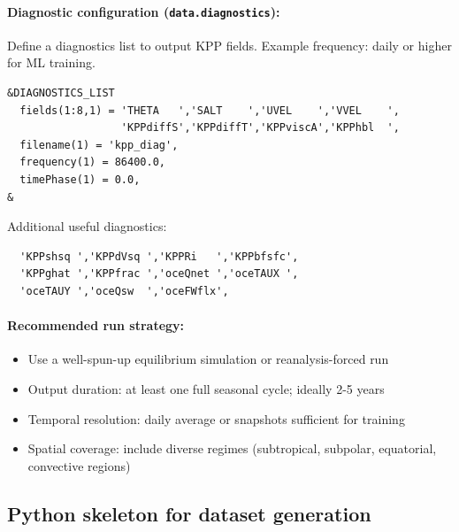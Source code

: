 \documentclass[11pt, a4paper]{article}
\begin{document}
\paragraph{Diagnostic configuration (\texttt{data.diagnostics}):}

Define a diagnostics list to output KPP fields. Example frequency: daily or higher for ML training.

\begin{verbatim}
&DIAGNOSTICS_LIST
  fields(1:8,1) = 'THETA   ','SALT    ','UVEL    ','VVEL    ',
                  'KPPdiffS','KPPdiffT','KPPviscA','KPPhbl  ',
  filename(1) = 'kpp_diag',
  frequency(1) = 86400.0,
  timePhase(1) = 0.0,
&
\end{verbatim}

Additional useful diagnostics:
\begin{verbatim}
  'KPPshsq ','KPPdVsq ','KPPRi   ','KPPbfsfc',
  'KPPghat ','KPPfrac ','oceQnet ','oceTAUX ',
  'oceTAUY ','oceQsw  ','oceFWflx',
\end{verbatim}

\paragraph{Recommended run strategy:}
\begin{itemize}
    \item Use a well-spun-up equilibrium simulation or reanalysis-forced run
    \item Output duration: at least one full seasonal cycle; ideally 2-5 years
    \item Temporal resolution: daily average or snapshots sufficient for training
    \item Spatial coverage: include diverse regimes (subtropical, subpolar, equatorial, convective regions)
\end{itemize}

\subsection{Python skeleton for dataset generation}
\end{document}
